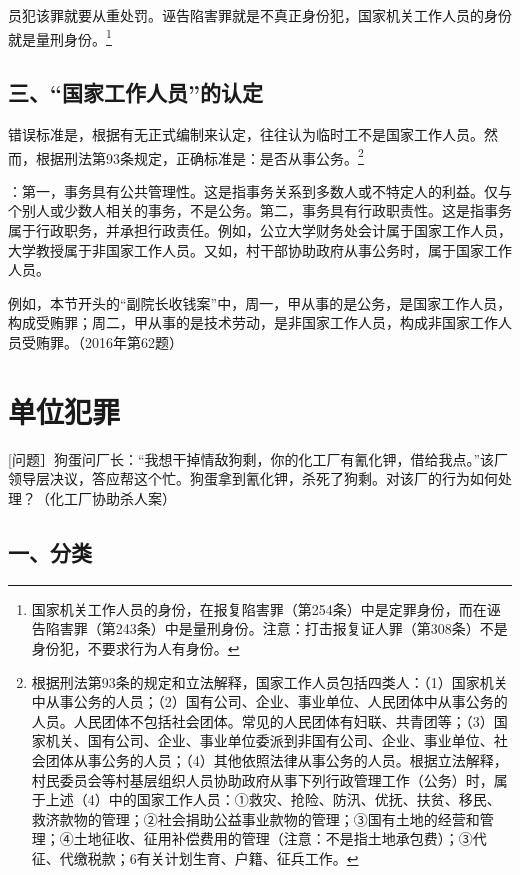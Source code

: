 员犯该罪就要从重处罚。诬告陷害罪就是不真正身份犯，国家机关工作人员的身份就是量刑身份。\footnote{国家机关工作人员的身份，在报复陷害罪（第254条）中是定罪身份，而在诬告陷害罪（第243条）中是量刑身份。注意：打击报复证人罪（第308条）不是身份犯，不要求行为人有身份。}

\subsection*{三、“国家工作人员”的认定}


错误标准是，根据有无正式编制来认定，往往认为临时工不是国家工作人员。然而，根据刑法第93条规定，正确标准是：是否从事公务。\footnote{根据刑法第93条的规定和立法解释，国家工作人员包括四类人：（1）国家机关中从事公务的人员；（2）国有公司、企业、事业单位、人民团体中从事公务的人员。人民团体不包括社会团体。常见的人民团体有妇联、共青团等；（3）国家机关、国有公司、企业、事业单位委派到非国有公司、企业、事业单位、社会团体从事公务的人员；（4）其他依照法律从事公务的人员。根据立法解释，村民委员会等村基层组织人员协助政府从事下列行政管理工作（公务）时，属于上述（4）中的国家工作人员：①救灾、抢险、防汛、优抚、扶贫、移民、救济款物的管理；②社会捐助公益事业款物的管理；③国有土地的经营和管理；④土地征收、征用补偿费用的管理（注意：不是指土地承包费）；③代征、代缴税款；6有关计划生育、户籍、征兵工作。}

：第一，事务具有公共管理性。这是指事务关系到多数人或不特定人的利益。仅与个别人或少数人相关的事务，不是公务。第二，事务具有行政职责性。这是指事务属于行政职务，并承担行政责任。例如，公立大学财务处会计属于国家工作人员，大学教授属于非国家工作人员。又如，村干部协助政府从事公务时，属于国家工作人员。

例如，本节开头的“副院长收钱案”中，周一，甲从事的是公务，是国家工作人员，构成受贿罪；周二，甲从事的是技术劳动，是非国家工作人员，构成非国家工作人员受贿罪。（2016年第62题）

\section{单位犯罪}

[问题］狗蛋问厂长：“我想干掉情敌狗剩，你的化工厂有氰化钾，借给我点。”该厂领导层决议，答应帮这个忙。狗蛋拿到氰化钾，杀死了狗剩。对该厂的行为如何处理？（化工厂协助杀人案）

\subsection*{一、分类}

